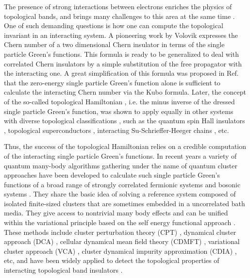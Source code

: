 \documentclass[12pt]{iopart}
\begin{document}
\par The presence of strong interactions between electrons enriches the physics of topological bands, and brings many challenges to this area at the same time \cite{HA_JPCM2013,R_RPP2018}. One of such demanding questions is how one can compute the topological invariant in an interacting system. A pioneering work by Volovik \cite{V2003} expresses the Chern number \cite{TKNN_PRL1982} of a two dimensional Chern insulator in terms of the single particle Green's functions. This formula is ready to be generalized to deal with correlated Chern insulators by a simple substitution of the free propagator with the interacting one. A great simplification of this formula was proposed in Ref. \cite{WZ_PRX2012} that the zero-energy single particle Green's function alone is sufficient to calculate the interacting Chern number via the Kubo formula. Later, the concept of the so-called topological Hamiltonian \cite{WY_JPCM2013}, i.e. the minus inverse of the dressed single particle Green's function, was shown to apply equally in other systems with diverse topological classifications \cite{WA_PRB2013,LEGW_PRB2013,HWGF_PRB2013,GMCBB_NJP2015,LS_PRB2018,SK_PRB2018}, such as the quantum spin Hall insulators \cite{LEGW_PRB2013,HWGF_PRB2013,GMCBB_NJP2015}, topological superconductors \cite{LS_PRB2018}, interacting Su-Schrieffer-Heeger chains \cite{SK_PRB2018}, etc.

\par Thus, the success of the topological Hamiltonian relies on a credible computation of the interacting single particle Green's functions. In recent years a variety of quantum many-body algorithms gathering under the name of quantum cluster approaches \cite{MJPH_RMP2005,S_arXiv2008} have been developed to calculate such single particle Green's functions of a broad range of strongly correlated fermionic systems \cite{SPP_PRL2000,HMJK_PRB2000,KSPB_PRL2001,PAD_PRL2003,ST_PRL2004,SS_PRL2008,BKSTP_EPL2009,KYXL_PRB2011,YXL_PRL2011,WRLH_PRB2012,YL_PRB2012,HD_PRL2013,LRTR_PRB2014,LYXL_PRB2014,RLRT_PRL2015} and bosonic systems \cite{KD_JPCM2006,KAL_PRB2011,YWDYL_PRB2018}. They share the basic idea of solving a reference system composed of isolated finite-sized clusters that are sometimes embedded in a uncorrelated bath media. They give access to nontrivial many body effects and can be unified within the variational principle based on the self energy functional approach \cite{P_EPJB2003}. These methods include cluster perturbation theory (CPT) \cite{SPP_PRL2000}, dynamical cluster approach (DCA) \cite{HMJK_PRB2000}, cellular dynamical mean field theory (CDMFT) \cite{KSPB_PRL2001}, variational cluster approach (VCA) \cite{PAD_PRL2003}, cluster dynamical impurity approximation (CDIA) \cite{BKSTP_EPL2009}, etc, and have been widely applied to detect the topological properties of interacting topological band insulators \cite{YXL_PRL2011,WRLH_PRB2012,LRTR_PRB2014,GMCBB_NJP2015,WFSM_PRB2016,LS_PRB2018}.
\end{document}
